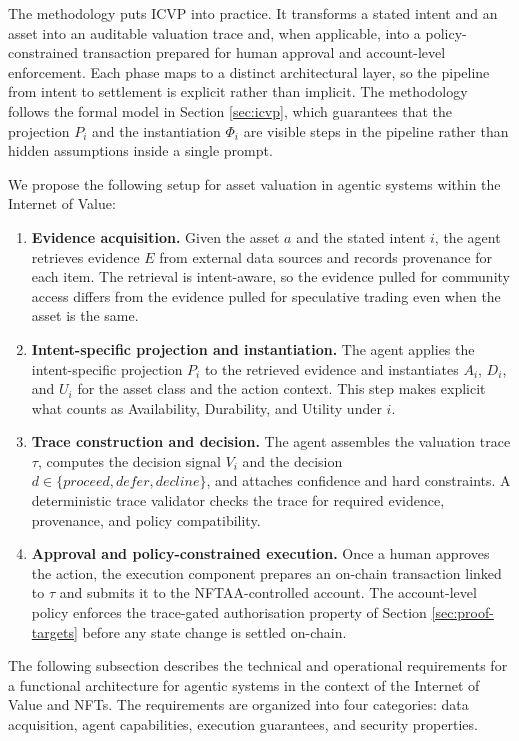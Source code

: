 The methodology puts ICVP into practice. It transforms a stated intent and an asset into an auditable valuation trace and, when applicable, into a policy-constrained transaction prepared for human approval and account-level enforcement. Each phase maps to a distinct architectural layer, so the pipeline from intent to settlement is explicit rather than implicit. The methodology follows the formal model in Section \ref{sec:icvp}, which guarantees that the projection $P_i$ and the instantiation $\Phi_i$ are visible steps in the pipeline rather than hidden assumptions inside a single prompt.

We propose the following setup for asset valuation in agentic systems within the Internet of Value:

\begin{enumerate}
    \item \textbf{Evidence acquisition.} Given the asset $a$ and the stated intent $i$, the agent retrieves evidence $E$ from external data sources and records provenance for each item. The retrieval is intent-aware, so the evidence pulled for community access differs from the evidence pulled for speculative trading even when the asset is the same.
    \item \textbf{Intent-specific projection and instantiation.} The agent applies the intent-specific projection $P_i$ to the retrieved evidence and instantiates $A_i$, $D_i$, and $U_i$ for the asset class and the action context. This step makes explicit what counts as Availability, Durability, and Utility under $i$.
    \item \textbf{Trace construction and decision.} The agent assembles the valuation trace $\tau$, computes the decision signal $V_i$ and the decision $d \in \{\textit{proceed}, \textit{defer}, \textit{decline}\}$, and attaches confidence and hard constraints. A deterministic trace validator checks the trace for required evidence, provenance, and policy compatibility.
    \item \textbf{Approval and policy-constrained execution.} Once a human approves the action, the execution component prepares an on-chain transaction linked to $\tau$ and submits it to the NFTAA-controlled account. The account-level policy enforces the trace-gated authorisation property of Section \ref{sec:proof-targets} before any state change is settled on-chain.
\end{enumerate}


The following subsection describes the technical and operational requirements for a functional architecture for agentic systems in the context of the Internet of Value and NFTs. The requirements are organized into four categories: data acquisition, agent capabilities, execution guarantees, and security properties.


